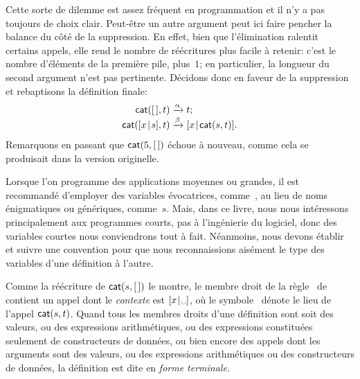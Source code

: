 Cette sorte de dilemme est assez fréquent en programmation et il n'y a
pas toujours de choix clair. Peut-être un autre argument peut ici
faire pencher la balance du côté de la suppression. En effet, bien que
l'élimination ralentit certains appels, elle rend le nombre de
réécritures plus facile à retenir: c'est le nombre d'éléments de la
première pile, plus~\(1\); en particulier, la longueur du second
argument n'est pas pertinente. Décidons donc en faveur de la
suppression et rebaptisons la définition finale:
\begin{equation*}
\begin{array}{r@{\;}l@{\;}l}
\fun{cat}(\el,t) & \xrightarrow{\alpha} & t;\\
\fun{cat}(\cons{x}{s},t) & \xrightarrow{\beta} &
\cons{x}{\fun{cat}(s,t)}.
\end{array}
\end{equation*}
Remarquons en passant que \(\textsf{cat}(5,[\,])\) échoue à nouveau, comme
cela se produisait dans la version originelle.

Lorsque l'on programme des applications moyennes ou grandes, il est
recommandé d'employer des variables évocatrices,
comme~, au lieu de noms énigmatiques ou
génériques, comme~\(s\). Mais, dans ce livre, nous nous intéressons
principalement aux programmes courts, pas à l'ingénierie du logiciel,
donc des variables courtes nous conviendrons tout à fait. Néanmoins,
nous devons établir et suivre une convention pour que nous
reconnaissions aisément le type des variables d'une définition à
l'autre.


Comme la réécriture de \(\textsf{cat}(s,[\,])\) le montre, le membre droit
de la règle~\clause{\beta} de  contient un appel dont le
\emph{contexte} est \(\cons{x}{\text{\textvisiblespace}}\), où le
symbole~\textvisiblespace{} dénote le lieu de l'appel
\(\textsf{cat}(s,t)\). Quand tous les membres droits d'une définition
sont soit des valeurs, ou des expressions arithmétiques, ou des
expressions constituées seulement de constructeurs de données, ou bien
encore des appels dont les arguments sont des valeurs, ou des
expressions arithmétiques ou des constructeurs de données, la
définition est dite en \emph{forme terminale}.

